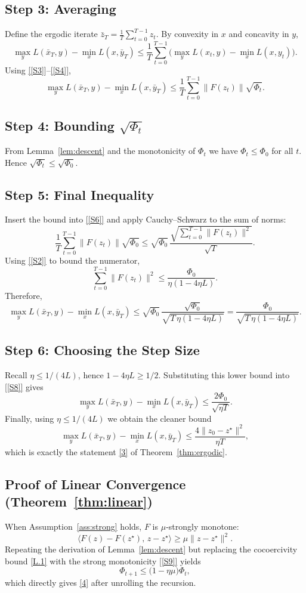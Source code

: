 \documentclass[11pt]{article}
\begin{document}
\subsection*{Step 3: Averaging}
Define the ergodic iterate $\bar z_T=\frac1T\sum_{t=0}^{T-1}z_t$. By convexity in $x$ and concavity in $y$,
\[
\max_{y}L(\bar x_T,y)-\min_{x}L(x,\bar y_T)
\le\frac1T\sum_{t=0}^{T-1}\Big(\max_{y}L(x_t,y)-\min_{x}L(x,y_t)\Big).
\tag{[S5]}
\]
Using \eqref{[S3}]–\eqref{[S4]},
\[
\max_{y}L(\bar x_T,y)-\min_{x}L(x,\bar y_T)
\le\frac1T\sum_{t=0}^{T-1}\|F(z_t)\|\sqrt{\Phi_t}.
\tag{[S6]}
\]

\subsection*{Step 4: Bounding $\sqrt{\Phi_t}$}
From Lemma~\ref{lem:descent} and the monotonicity of $\Phi_t$ we have $\Phi_t\le\Phi_0$ for all $t$. Hence $\sqrt{\Phi_t}\le\sqrt{\Phi_0}$.

\subsection*{Step 5: Final Inequality}
Insert the bound into \eqref{[S6]} and apply Cauchy–Schwarz to the sum of norms:
\[
\frac1T\sum_{t=0}^{T-1}\|F(z_t)\|\sqrt{\Phi_0}
\le\sqrt{\Phi_0}\,\frac{\sqrt{\sum_{t=0}^{T-1}\|F(z_t)\|^2}}{\sqrt{T}}.
\tag{[S7]}
\]
Using \eqref{[S2]} to bound the numerator,
\[
\sum_{t=0}^{T-1}\|F(z_t)\|^2\le\frac{\Phi_0}{\eta(1-4\eta L)}.
\]
Therefore,
\[
\max_{y}L(\bar x_T,y)-\min_{x}L(x,\bar y_T)
\le\sqrt{\Phi_0}\,\frac{\sqrt{\Phi_0}}{\sqrt{T\,\eta(1-4\eta L)}}
=\frac{\Phi_0}{\sqrt{T\,\eta(1-4\eta L)}}.
\tag{[S8]}
\]

\subsection*{Step 6: Choosing the Step Size}
Recall $\eta\le 1/(4L)$, hence $1-4\eta L\ge 1/2$. Substituting this lower bound into \eqref{[S8]} gives
\[
\max_{y}L(\bar x_T,y)-\min_{x}L(x,\bar y_T)
\le\frac{2\Phi_0}{\sqrt{\eta T}}.
\]
Finally, using $\eta\le 1/(4L)$ we obtain the cleaner bound
\[
\max_{y}L(\bar x_T,y)-\min_{x}L(x,\bar y_T)
\le\frac{4\|z_0-z^{\star}\|^2}{\eta T},
\]
which is exactly the statement \eqref{3} of Theorem~\ref{thm:ergodic}. \hfill\qedsymbol

\subsection*{Proof of Linear Convergence (Theorem~\ref{thm:linear})}
When Assumption~\ref{ass:strong} holds, $F$ is $\mu$‑strongly monotone:
\[
\langle F(z)-F(z^{\star}),\,z-z^{\star}\rangle\ge\mu\|z-z^{\star}\|^2.
\tag{[S9]}
\]
Repeating the derivation of Lemma~\ref{lem:descent} but replacing the cocoercivity bound \eqref{L.1} with the strong monotonicity \eqref{[S9]} yields
\[
\Phi_{t+1}\le\bigl(1-\eta\mu\bigr)\Phi_t,
\tag{[S10]}
\]
which directly gives \eqref{4} after unrolling the recursion. \hfill\qedsymbol
\end{document}
